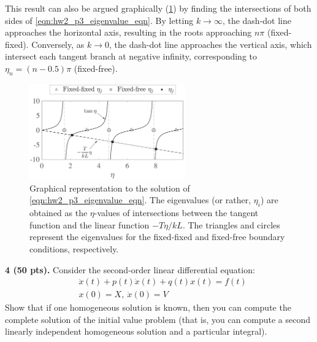This result can also be argued graphically (\cref{fig:hw2_p3_eval_eqn}) by finding the intersections of both sides of \cref{eqn:hw2_p3_eigenvalue_eqn}. 
By letting $k\rightarrow \infty$, the dash-dot line approaches the horizontal axis, resulting in the roots approaching $n\pi$ (fixed-fixed). 
Conversely, as $k\rightarrow 0$, the dash-dot line approaches the vertical axis, which intersect each tangent branch at negative infinity, corresponding to $\eta_n = (n-0.5)\pi$ (fixed-free). 
\begin{figure}[!ht]
    \centering
    \includegraphics[width=0.6\textwidth]{homework/hw2/assets/hw2_p3_eval_eqn.pdf}
    \caption{Graphical representation to the solution of \cref{eqn:hw2_p3_eigenvalue_eqn}. The eigenvalues (or rather, $\eta_i$) are obtained as the $\eta$-values of intersections between the tangent function and the linear function $-T\eta / kL$. The triangles and circles represent the eigenvalues for the fixed-fixed and fixed-free boundary conditions, respectively.}
    \label{fig:hw2_p3_eval_eqn}
\end{figure}


\begin{problem}
\textbf{4 (50 pts).} Consider the second-order linear differential equation:
\begin{equation}
\begin{aligned}
    &\ddot{x}(t) + p(t) \dot{x}(t) + q(t) x(t) = f(t) \\
    &x(0) = X, ~\dot{x}(0) = V
\end{aligned}
\end{equation}
Show that if one homogeneous solution is known, then you can compute the complete solution of the initial value problem (that is, you can compute a second linearly independent homogeneous solution and a particular integral).
\end{problem}

